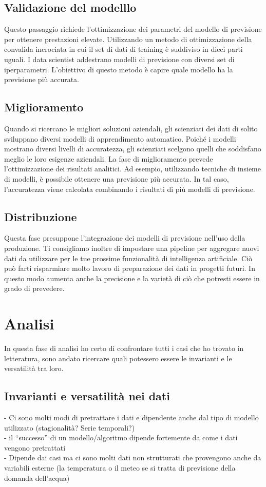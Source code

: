 \documentclass[12pt,a4paper]{report}
\begin{document}
\subsection{Validazione del modelllo}
Questo passaggio richiede l'ottimizzazione dei parametri del modello di previsione per ottenere prestazioni elevate. Utilizzando un metodo di ottimizzazione della convalida incrociata in cui il set di dati di training è suddiviso in dieci parti uguali. I data scientist addestrano modelli di previsione con diversi set di iperparametri. L'obiettivo di questo metodo è capire quale modello ha la previsione più accurata.


\subsection{Miglioramento}
Quando si ricercano le migliori soluzioni aziendali, gli scienziati dei dati di solito sviluppano diversi modelli di apprendimento automatico. Poiché i modelli mostrano diversi livelli di accuratezza, gli scienziati scelgono quelli che soddisfano meglio le loro esigenze aziendali. La fase di miglioramento prevede l'ottimizzazione dei risultati analitici. Ad esempio, utilizzando tecniche di insieme di modelli, è possibile ottenere una previsione più accurata. In tal caso, l'accuratezza viene calcolata combinando i risultati di più modelli di previsione.

\subsection{Distribuzione}
Questa fase presuppone l'integrazione dei modelli di previsione nell'uso della produzione. Ti consigliamo inoltre di impostare una pipeline per aggregare nuovi dati da utilizzare per le tue prossime funzionalità di intelligenza artificiale. Ciò può farti risparmiare molto lavoro di preparazione dei dati in progetti futuri. In questo modo aumenta anche la precisione e la varietà di ciò che potresti essere in grado di prevedere.


\section{Analisi}
In questa fase di analisi ho certo di confrontare tutti i casi che ho trovato in letteratura, sono andato ricercare quali potessero essere le invarianti e le versatilità tra loro.

\subsection{Invarianti e versatilità nei dati}
-	Ci sono molti modi di pretrattare i dati e dipendente anche dal tipo di modello utilizzato (stagionalità? Serie temporali?)
\\
-	il “successo” di un modello/algoritmo dipende fortemente da come i dati vengono pretrattati\\
-	Dipende dai casi ma ci sono molti dati non strutturati che provengono anche da variabili esterne (la temperatura o il meteo se si tratta di previsione della domanda dell’acqua)
\end{document}

